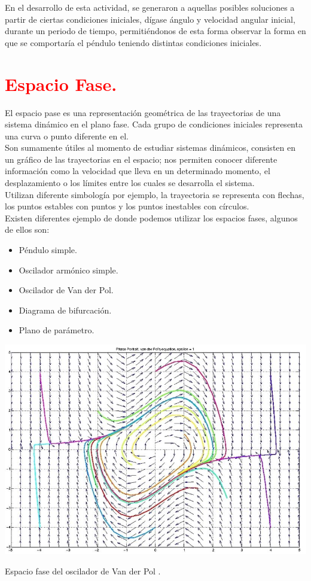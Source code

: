 \documentclass[12pt]{article}
\begin{document}
 En el desarrollo de esta actividad, se generaron a aquellas posibles soluciones a partir de ciertas condiciones iniciales, dígase ángulo y velocidad angular inicial, durante un periodo de tiempo, permitiéndonos de esta forma observar la forma en que se comportaría el péndulo teniendo distintas condiciones iniciales.
 
 
\section*{\textcolor{Red}{Espacio Fase.}}
El espacio pase es una representación geométrica de las trayectorias de una sistema dinámico en el plano fase. Cada grupo de condiciones iniciales representa una curva o punto diferente en el.\\

Son sumamente útiles al momento de estudiar sistemas dinámicos, consisten en un gráfico de las trayectorias en el espacio; nos permiten conocer diferente información como la velocidad que lleva en un determinado momento, el desplazamiento o los límites entre los cuales se desarrolla el sistema.\\

 Utilizan diferente simbología por ejemplo, la trayectoria se representa con flechas, los puntos estables con puntos y los puntos inestables con círculos.\\
	

Existen diferentes ejemplo de donde podemos utilizar los espacios fases, algunos de ellos son:
\begin{itemize}
\item Péndulo simple.
\item Oscilador armónico simple.
\item Oscilador de Van der Pol.
\item Diagrama de bifurcación.
\item Plano de parámetro.
\end{itemize}

\begin{center}
      \includegraphics[scale=0.4]{espaciofase.jpg}
      
      \caption{Espacio fase del oscilador de Van der Pol \cite{Img1}.}
    \end{center}
\end{document}
